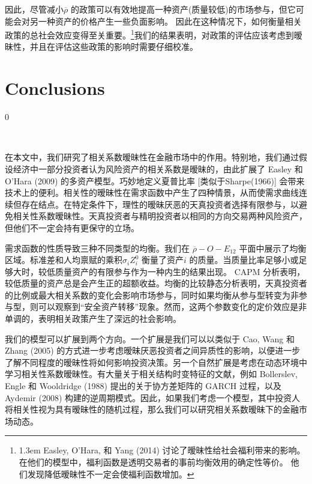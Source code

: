 \documentclass[10.0pt]{article}
\begin{document}
因此，尽管减小$ \overline{\rho} $ 的政策可以有效地提高一种资产(质量较低)的市场参与，但它可能会对另一种资产的价格产生一些负面影响。 因此在这种情况下，如何衡量相关政策的总社会效应变得至关重要。\footnote{\baselineskip1.3em Easley, O'Hara, 和 Yang (2014) 讨论了暧昧性给社会福利带来的影响。在他们的模型中，福利函数是透明交易者的事前均衡效用的确定性等价。 他们发现降低暧昧性不一定会使福利函数增加。}我们的结果表明，对政策的评估应该考虑到暧昧性，并且在评估这些政策的影响时需要仔细校准。

\section{Conclusions}
\renewcommand{\theequation}{5.\arabic{equation}}
\setcounter{equation}0

\quad \ 

在本文中，我们研究了相关系数暧昧性在金融市场中的作用。特别地，我们通过假设经济中一部分投资者认为风险资产的相关系数是暧昧的，由此扩展了 Easley 和 O'Hara (2009) 的多资产模型。巧妙地定义夏普比率 [类似于Sharpe(1966)] 会带来技术上的便利。相关性的暧昧性在需求函数中产生了四种情景，从而使需求曲线连续但存在结点。在特定条件下，理性的暧昧厌恶的天真投资者选择有限参与，以避免相关性系数暧昧性。天真投资者与精明投资者以相同的方向交易两种风险资产，但他们不一定会持有更保守的立场。



需求函数的性质导致三种不同类型的均衡。我们在 $ \overline{\rho} - O - E_{12} $ 平面中展示了均衡区域。标准差和人均禀赋的乘积$ \sigma_i Z_i^0 $ 衡量了资产$i$ 的质量。当质量比率足够小或足够大时，较低质量资产的有限参与作为一种内生的结果出现。 CAPM 分析表明，较低质量的资产总是会产生正的超额收益。均衡的比较静态分析表明，天真投资者的比例或最大相关系数的变化会影响市场参与，同时如果均衡从参与型转变为非参与型，则可以观察到“安全资产转移”现象。然而，这两个参数变化的定价效应是非单调的，表明相关政策产生了深远的社会影响。



我们的模型可以扩展到两个方向。一个扩展是我们可以以类似于 Cao, Wang 和 Zhang (2005) 的方式进一步考虑暧昧厌恶投资者之间异质性的影响，以便进一步了解不同程度的暧昧性将如何影响投资决策。另一个自然扩展是考虑在动态环境中学习相关性系数暧昧性。有大量关于相关结构时变特征的文献，例如 Bollerslev, Engle 和 Wooldridge (1988) 提出的关于协方差矩阵的 GARCH 过程，以及 Aydemir (2008) 构建的逆周期模式。因此，如果我们考虑一个模型，其中投资人将相关性视为具有暧昧性的随机过程，那么我们可以研究相关系数暧昧下的金融市场动态。

\end{document}
